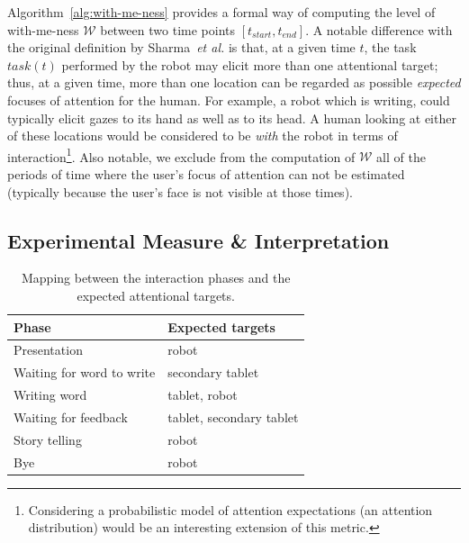 \documentclass{sig-alternate}
\newcommand{\etal}{\textit{et al.}\xspace}
\begin{document}
Algorithm~\ref{alg:with-me-ness} provides a formal way of computing the level of
with-me-ness $\mathcal{W}$ between two time points $[t_{start}, t_{end}]$. A
notable difference with the original definition by Sharma~\etal is that, at a
given time $t$, the task $task(t)$ performed by the robot may elicit more than
one attentional target; thus, at a given time, more than one location can be
regarded as possible \emph{expected} focuses of attention for the human. For
example, a robot which is writing, could typically elicit gazes to its hand as
well as to its head. A human looking at either of these locations would be
considered to be \emph{with} the robot in terms of
interaction\footnote{Considering a probabilistic model of attention expectations
(an attention distribution) would be an interesting extension of this metric.}.
Also notable, we exclude from the computation of $\mathcal{W}$ all of the
periods of time where the user's focus of attention can not be estimated
(typically because the user's face is not visible at those times).

\subsection{Experimental Measure \& Interpretation}

\begin{table}[t]
    \centering
    \caption{Mapping between the interaction phases and the expected
        attentional targets.}

    \begin{tabular}{ll}
        \toprule
        {\bf Phase} & {\bf Expected targets} \\
        \midrule
        Presentation & {\sf robot} \\ 
        Waiting for word to write & {\sf secondary tablet} \\ 
        Writing word & {\sf tablet}, {\sf robot} \\ 
        Waiting for feedback & {\sf tablet}, {\sf secondary tablet} \\ 
        Story telling & {\sf robot} \\ 
        Bye & {\sf robot} \\ 
        \bottomrule
    \end{tabular}
    \label{tab:targets}
\end{table}
\end{document}
